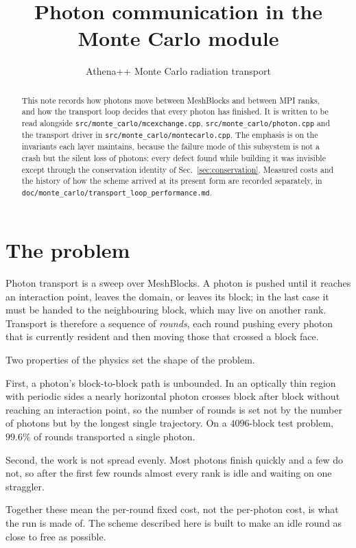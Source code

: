 \documentclass[11pt]{article}
\title{Photon communication in the Monte Carlo module}
\author{Athena++ Monte Carlo radiation transport}
\date{}
\begin{document}
\maketitle

\begin{abstract}
This note records how photons move between MeshBlocks and between MPI ranks, and how the
transport loop decides that every photon has finished. It is written to be read alongside
\texttt{src/monte\_carlo/mcexchange.cpp}, \texttt{src/monte\_carlo/photon.cpp} and the
transport driver in \texttt{src/monte\_carlo/montecarlo.cpp}. The emphasis is on the
invariants each layer maintains, because the failure mode of this subsystem is not a crash
but the silent loss of photons: every defect found while building it was invisible except
through the conservation identity of Sec.~\ref{sec:conservation}. Measured costs and the
history of how the scheme arrived at its present form are recorded separately, in
\texttt{doc/monte\_carlo/transport\_loop\_performance.md}.
\end{abstract}

\section{The problem}

Photon transport is a sweep over MeshBlocks. A photon is pushed until it reaches an
interaction point, leaves the domain, or leaves its block; in the last case it must be
handed to the neighbouring block, which may live on another rank. Transport is therefore a
sequence of \emph{rounds}, each round pushing every photon that is currently resident and
then moving those that crossed a block face.

Two properties of the physics set the shape of the problem.

First, a photon's block-to-block path is unbounded. In an optically thin region with
periodic sides a nearly horizontal photon crosses block after block without reaching an
interaction point, so the number of rounds is set not by the number of photons but by the
longest single trajectory. On a $4096$-block test problem, $99.6\%$ of rounds transported a
single photon.

Second, the work is not spread evenly. Most photons finish quickly and a few do not, so
after the first few rounds almost every rank is idle and waiting on one straggler.

Together these mean the per-round fixed cost, not the per-photon cost, is what the run is
made of. The scheme described here is built to make an idle round as close to free as
possible.
\end{document}
